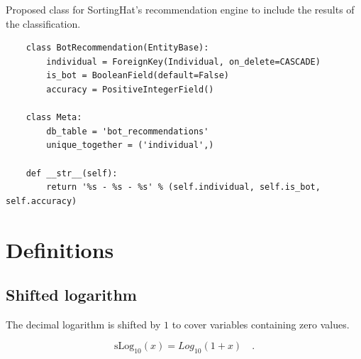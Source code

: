\documentclass[a4paper, 12pt]{book}
\begin{document}
\begin{listing}[h!]
    \caption{Proposed class for SortingHat's recommendation engine to include the results of the classification.}{}
    \label{lst:sh-recommend}
    \begin{verbatim}
    class BotRecommendation(EntityBase):
        individual = ForeignKey(Individual, on_delete=CASCADE)
        is_bot = BooleanField(default=False)
        accuracy = PositiveIntegerField()

    class Meta:
        db_table = 'bot_recommendations'
        unique_together = ('individual',)

    def __str__(self):
        return '%s - %s - %s' % (self.individual, self.is_bot, self.accuracy)
    \end{verbatim}
\end{listing}




\cleardoublepage
\appendix

\chapter{Definitions}
\label{app:app-definitions}

\section{Shifted logarithm}
\label{sec:form-one-plus-log10}

The decimal logarithm is shifted by $1$ to cover variables containing zero values.

\begin{center}
    \begin{equation}
        \mathrm{sLog_{10}}(x) = Log_{10}(1 + x) \quad .
    \end{equation}
\end{center}
\end{document}
